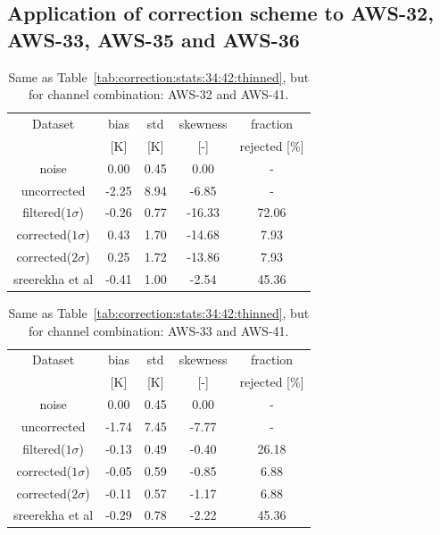 \documentclass[12pt]{article}
\begin{document}
\subsection{Application of correction scheme to AWS-32, AWS-33, AWS-35 and AWS-36}
%


\begin{table}[!p]
	\centering
	\begin{tabular}[b]{c|c|c|c|c}
		Dataset  		  &   bias &   std & skewness & fraction \\
		&   [K]  &   [K] & [-] & rejected [\%]\\
		\hline
		noise             		&   0.00 &  0.45 &               0.00 &                - \\
		uncorrected       		&  -2.25 &  8.94 &              -6.85 &                 - \\
		filtered($1\sigma$)  	&  -0.26 &  0.77 &             -16.33 &               72.06 \\
		corrected($1\sigma$) 	&   0.43 &  1.70 &             -14.68 &                7.93 \\
		corrected($2\sigma$) 	&   0.25 &  1.72 &             -13.86 &                7.93 \\
		sreerekha et al   		&  -0.41 &  1.00 &              -2.54 &               45.36 \\
		\hline
	\end{tabular}
	\caption{Same as Table~\ref{tab:correction:stats:34:42:thinned}, but for channel combination: AWS-32 and AWS-41.   }
	\label{tab:correction:stats:32:41}
\end{table}

\begin{table}[!p]
	\centering
	\begin{tabular}[b]{c|c|c|c|c}
		Dataset  		  &   bias &   std &  skewness  & fraction\\
		&   [K]  &   [K] & [-]  & rejected [\%]\\
		\hline
		noise       	    	&  0.00 &  0.45 &               0.00 &               - \\
		uncorrected	    		&  -1.74 &  7.45 &              -7.77 &                - \\
		filtered($1\sigma$)  	&  -0.13 &  0.49 &              -0.40 &               26.18 \\
		corrected($1\sigma$) 	&  -0.05 &  0.59 &              -0.85 &                6.88 \\
		corrected($2\sigma$) 	&  -0.11 &  0.57 &              -1.17 &                6.88 \\
		sreerekha et al   		&  -0.29 &  0.78 &              -2.22 &               45.36 \\
		\hline
	\end{tabular}
	\caption{Same as Table~\ref{tab:correction:stats:34:42:thinned}, but for channel combination: AWS-33 and AWS-41.   }
	\label{tab:correction:stats:33:41}
\end{table}
\end{document}
